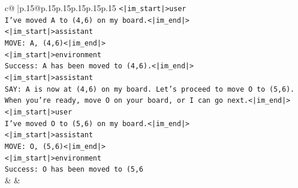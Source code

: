 \documentclass{article}
\begin{document}
{\begin{supertabular}{c@{$\;$}|p{.15\linewidth}@{}p{.15\linewidth}p{.15\linewidth}p{.15\linewidth}p{.15\linewidth}p{.15\linewidth}}
{{{\texttt{<|im\_start|>user} \\
\texttt{I've moved A to (4,6) on my board.<|im\_end|>} \\
\texttt{<|im\_start|>assistant} \\
\texttt{MOVE: A, (4,6)<|im\_end|>} \\
\texttt{<|im\_start|>environment} \\
\texttt{Success: A has been moved to (4,6).<|im\_end|>} \\
\texttt{<|im\_start|>assistant} \\
\texttt{SAY: A is now at (4,6) on my board. Let's proceed to move O to (5,6). When you're ready, move O on your board, or I can go next.<|im\_end|>} \\
\texttt{<|im\_start|>user} \\
\texttt{I've moved O to (5,6) on my board.<|im\_end|>} \\
\texttt{<|im\_start|>assistant} \\
\texttt{MOVE: O, (5,6)<|im\_end|>} \\
\texttt{<|im\_start|>environment} \\
\texttt{Success: O has been moved to (5,6} \\
            }
        }
    }
    & & \\ \\


\end{supertabular}}
\end{document}
